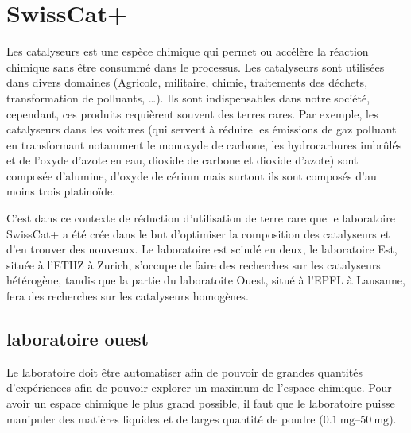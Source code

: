 \section{SwissCat+}
Les catalyseurs est une espèce chimique qui permet ou accélère la réaction chimique sans être consummé dans le processus. Les catalyseurs sont utilisées dans divers domaines (Agricole, militaire, chimie, traitements des déchets, transformation de polluants, \dots). Ils sont indispensables dans notre société, cependant, ces produits requièrent souvent des terres rares. Par exemple, les catalyseurs dans les voitures (qui servent à réduire les émissions de gaz polluant en transformant notamment le monoxyde de carbone, les hydrocarbures imbrûlés et de l'oxyde d'azote en eau, dioxide de carbone et dioxide d'azote) sont composée d'alumine, d'oxyde de cérium mais surtout ils sont composés d'au moins trois platinoïde.


C'est dans ce contexte de réduction d'utilisation de terre rare que le laboratoire SwissCat+ a été crée dans le but d'optimiser la composition des catalyseurs et d'en trouver des nouveaux. Le laboratoire est scindé en deux, le laboratoire Est, située à l'ETHZ à Zurich, s'occupe de faire des recherches sur les catalyseurs hétérogène, tandis que la partie du laboratoite Ouest, situé à l'EPFL à Lausanne, fera des recherches sur les catalyseurs homogènes.
\subsection{laboratoire ouest}
Le laboratoire doit être automatiser afin de pouvoir de grandes quantités d'expériences afin de pouvoir explorer un maximum de l'espace chimique. Pour avoir un espace chimique le plus grand possible, il faut que le laboratoire puisse manipuler des matières liquides et de larges quantité de poudre ($\qtyrange[range-units=single]{0.1}{50}{\mg} $).

